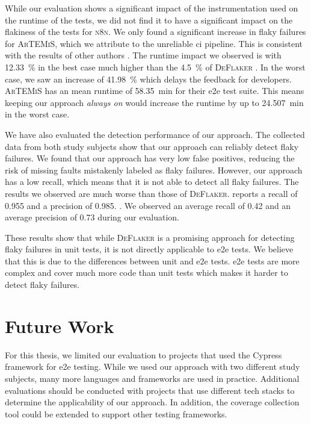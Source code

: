While our evaluation shows a significant impact of the instrumentation used on the runtime of the tests, we did not find it to have a significant impact on the flakiness of the tests for \textsc{n8n}.
We only found a significant increase in flaky failures for \textsc{ArTEMiS}, which we attribute to the unreliable \ac{ci} pipeline.
This is consistent with the results of other authors \autocite{rasheed_effect_2023}.
The runtime impact we observed is with \SI{12.33}{\percent} in the best case much higher than the \SI{4.5}{\percent} of \textsc{DeFlaker} \autocite{bell_deflaker_2018}.
In the worst case, we saw an increase of \SI{41.98}{\percent} which delays the feedback for developers.
\textsc{ArTEMiS} has an mean runtime of \SI{58.35}{\minute} for their \ac{e2e} test suite.
This means keeping our approach \textit{always on} would increase the runtime by up to \SI{24.507}{\minute} in the worst case.

We have also evaluated the detection performance of our approach.
The collected data from both study subjects show that our approach can reliably detect flaky failures.
We found that our approach has very low false positives, reducing the risk of missing faults mistakenly labeled as flaky failures.
However, our approach has a low recall, which means that it is not able to detect all flaky failures.
The results we observed are much worse than those of \textsc{DeFlaker}.
 reports a recall of \num{0.955} and a precision of \num{0.985}. \cite{bell_deflaker_2018}.
We observed an average recall of \num{0.42} and an average precision of \num{0.73} during our evaluation.

These results show that while \textsc{DeFlaker} is a promising approach for detecting flaky failures in unit tests, it is not directly applicable to \ac{e2e} tests.
We believe that this is due to the differences between unit and \ac{e2e} tests.
\Ac{e2e} tests are more complex and cover much more code than unit tests which makes it harder to detect flaky failures.

\section{Future Work}
For this thesis, we limited our evaluation to projects that used the Cypress framework for \ac{e2e} testing.
While we used our approach with two different study subjects, many more languages and frameworks are used in practice.
Additional evaluations should be conducted with projects that use different tech stacks to determine the applicability of our approach.
In addition, the coverage collection tool could be extended to support other testing frameworks.

